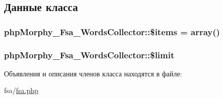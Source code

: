 \subsection{Данные класса}
\hypertarget{classphpMorphy__Fsa__WordsCollector_aee90e76e758df018693ccb082d5c0949}{
\subsubsection[{\$items}]{\setlength{\rightskip}{0pt plus 5cm}phpMorphy\_\-Fsa\_\-WordsCollector::\$items = array()}}
\label{classphpMorphy__Fsa__WordsCollector_aee90e76e758df018693ccb082d5c0949}
\hypertarget{classphpMorphy__Fsa__WordsCollector_aeb220e735cacc2afd8ad794b65163b3d}{
\subsubsection[{\$limit}]{\setlength{\rightskip}{0pt plus 5cm}phpMorphy\_\-Fsa\_\-WordsCollector::\$limit}}
\label{classphpMorphy__Fsa__WordsCollector_aeb220e735cacc2afd8ad794b65163b3d}


Объявления и описания членов класса находятся в файле:\begin{DoxyCompactItemize}
\item 
fsa/\hyperlink{fsa_8php}{fsa.php}\end{DoxyCompactItemize}
